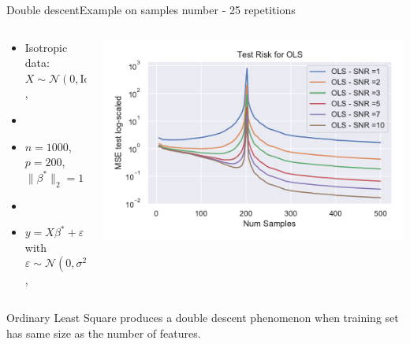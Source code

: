 \documentclass[10pt,aspectratio=43]{beamer}
\begin{document}
\begin{frame}{Double descent}{Example on samples number - 25 repetitions}
    \begin{columns}
        \begin{column}{0.46\textwidth}
            \begin{itemize}
                \item Isotropic data: $X\sim\mathcal{N}(0,\mathrm{Id})$,
                \item[]
                \item $n=1000$, $p=200$, $\|\beta^*\|_2=1$
                \item[]
                \item $y = X\beta^*+\varepsilon$ with $\varepsilon\sim \mathcal{N}(0, \sigma^2\mathrm{Id})$,
            \end{itemize}
        \end{column}
        \begin{column}{0.7\textwidth}
            \begin{center}
             \includegraphics[width=1\textwidth]{ols_fail_log_snr.pdf}
             \end{center}
        \end{column}
        \end{columns}
        \begin{block}{}
            Ordinary Least Square produces a double descent phenomenon when training set has same size as the number of features.
        \end{block}
\end{frame}
\end{document}
